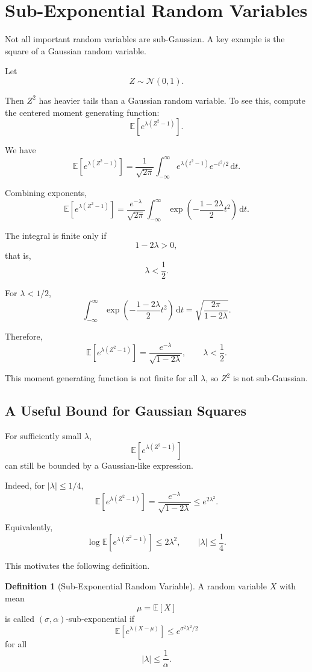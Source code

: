 \documentclass[12pt,oneside]{book}
\numberwithin{equation}{section}
\theoremstyle{definition}
\newtheorem{definition}{Definition}[section]
\theoremstyle{plain}
\theoremstyle{remark}
\newcommand{\E}{\mathbb{E}}
\newcommand{\dd}{\,\mathrm{d}}
\newcommand{\Normal}{\mathcal{N}}
\begin{document}
\section{Sub-Exponential Random Variables}

Not all important random variables are sub-Gaussian. A key example is the square of a Gaussian random variable.

Let
\[
Z\sim \Normal(0,1).
\]

Then $Z^2$ has heavier tails than a Gaussian random variable. To see this, compute the centered moment generating function:
\[
\E\left[e^{\lambda(Z^2-1)}\right].
\]

We have
\[
\E\left[e^{\lambda(Z^2-1)}\right]
=
\frac{1}{\sqrt{2\pi}}
\int_{-\infty}^{\infty}
e^{\lambda(t^2-1)}
e^{-t^2/2}
\dd t.
\]

Combining exponents,
\[
\E\left[e^{\lambda(Z^2-1)}\right]
=
\frac{e^{-\lambda}}{\sqrt{2\pi}}
\int_{-\infty}^{\infty}
\exp\left(
-\frac{1-2\lambda}{2}t^2
\right)
\dd t.
\]

The integral is finite only if
\[
1-2\lambda>0,
\]
that is,
\[
\lambda<\frac{1}{2}.
\]

For $\lambda<1/2$,
\[
\int_{-\infty}^{\infty}
\exp\left(
-\frac{1-2\lambda}{2}t^2
\right)
\dd t
=
\sqrt{\frac{2\pi}{1-2\lambda}}.
\]

Therefore,
\[
\E\left[e^{\lambda(Z^2-1)}\right]
=
\frac{e^{-\lambda}}{\sqrt{1-2\lambda}},
\qquad
\lambda<\frac{1}{2}.
\]

This moment generating function is not finite for all $\lambda$, so $Z^2$ is not sub-Gaussian.

\subsection{A Useful Bound for Gaussian Squares}

For sufficiently small $\lambda$,
\[
\E\left[e^{\lambda(Z^2-1)}\right]
\]
can still be bounded by a Gaussian-like expression.

Indeed, for $|\lambda|\leq 1/4$,
\[
\E\left[e^{\lambda(Z^2-1)}\right]
=
\frac{e^{-\lambda}}{\sqrt{1-2\lambda}}
\leq
e^{2\lambda^2}.
\]

Equivalently,
\[
\log\E\left[e^{\lambda(Z^2-1)}\right]
\leq
2\lambda^2,
\qquad
|\lambda|\leq \frac{1}{4}.
\]

This motivates the following definition.

\begin{definition}[Sub-Exponential Random Variable]
A random variable $X$ with mean
\[
\mu=\E[X]
\]
is called $(\sigma,\alpha)$-sub-exponential if
\[
\E\left[e^{\lambda(X-\mu)}\right]
\leq
e^{\sigma^2\lambda^2/2}
\]
for all
\[
|\lambda|\leq \frac{1}{\alpha}.
\]
\end{definition}
\end{document}
